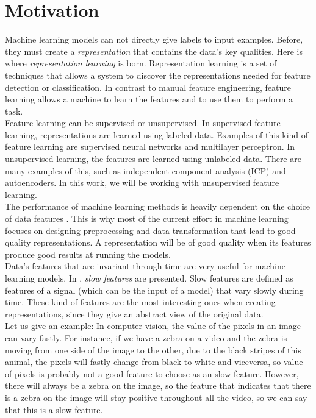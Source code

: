 
\section*{Motivation}
Machine learning models can not directly give labels to input examples. Before, they must create a \emph{representation} that 
contains the data's key qualities.  Here is where \emph{representation learning} is born. 
Representation learning is a set of techniques that allows a system to discover the representations needed for feature detection or classification. 
In contrast to manual feature engineering, feature learning allows a machine to learn the features and to use them to perform a task.\\

Feature learning can be supervised or unsupervised. In supervised feature learning, representations are learned using labeled data.
Examples of this kind of feature learning are supervised neural networks and multilayer perceptron. In unsupervised learning, the features are learned using unlabeled data. 
There are many examples of this, such as independent component analysis (ICP) and autoencoders. In this work, we will be working with unsupervised feature learning.\\


The performance of machine learning methods is heavily dependent on the choice of data features \cite{bengio_representation_2014}. This is why most of the current 
effort in machine learning focuses on designing preprocessing and data transformation that lead to good quality representations. A representation will be of good quality when its features
produce good results at running the models.\\

Data's features that are invariant through time are very useful for machine learning models. In \cite{wiskott_slow_2002}, \emph{slow features} are presented. Slow features are defined as features of a signal 
(which can be the input of a model) that vary slowly during time. These kind of features are the most interesting ones when creating representations, since they give an abstract view of the original data.\\

Let us give an example: In computer vision, the value of the pixels in an image can vary fastly. For instance, if we have a zebra on a video and the zebra is moving from one side of the image to the other, due 
to the black stripes of this animal, the pixels will fastly change from black to white and viceversa, so value of pixels is probably not a good feature to choose as an slow feature. However, there will always
be a zebra on the image, so the feature that indicates that there is a zebra on the image will stay positive throughout all the video, so we can say that this is a slow feature.